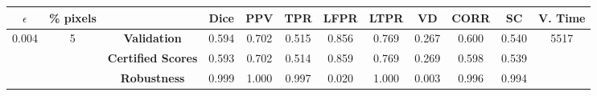 \begin{longtable}{ c  c | c | c  c  c  c  c  c  c c c}
\toprule \textbf{$\epsilon$} & \textbf{\% pixels} & & \textbf{Dice} & \textbf{PPV} & \textbf{TPR} & \textbf{LFPR} & \textbf{LTPR} & \textbf{VD} & \textbf{CORR} & \textbf{SC} & \textbf{V. Time} \\
\midrule 
\multirow{3}{*}{0.004}  & \multirow{3}{*}{5} &\textbf{Validation} & 0.594 & 0.702 & 0.515 & 0.856 & 0.769 & 0.267 & 0.600 & 0.540 & \multirow{3}{*}{5517} \\
 & & \textbf{Certified Scores} & 0.593 & 0.702 & 0.514 & 0.859 & 0.769 & 0.269 & 0.598 & 0.539 & \\
& & \textbf{Robustness} & 0.999 & 1.000 & 0.997 & 0.020 & 1.000 & 0.003 & 0.996 & 0.994 & \\
\end{longtable}